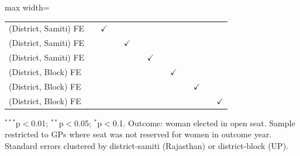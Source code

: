 \begin{adjustbox}{max width=\linewidth}
\begin{threeparttable}[b]
\begin{tabular}{lcccccccccccc}
          \\
         (District, Samiti) FE &              & $\checkmark$  &              &               &              &               &              &               &              &               &              & \\  
         (District, Samiti) FE &              &               &              & $\checkmark$  &              &               &              &               &              &               &              & \\  
         (District, Samiti) FE &              &               &              &               &              & $\checkmark$  &              &               &              &               &              & \\  
         (District, Block) FE  &              &               &              &               &              &               &              & $\checkmark$  &              &               &              & \\  
         (District, Block) FE  &              &               &              &               &              &               &              &               &              & $\checkmark$  &              & \\  
         (District, Block) FE  &              &               &              &               &              &               &              &               &              &               &              & $\checkmark$\\   
         \bottomrule
      \end{tabular}
      
      \begin{tablenotes}
         \item $^{***}$p$<$0.01; $^{**}$p$<$0.05; $^{*}$p$<$0.1. Outcome: woman elected in open seat. Sample restricted to GPs where seat was not reserved for women in outcome year. Standard errors clustered by district-samiti (Rajasthan) or district-block (UP).
      \end{tablenotes}
   \end{threeparttable}
\end{adjustbox}
\par\endgroup


